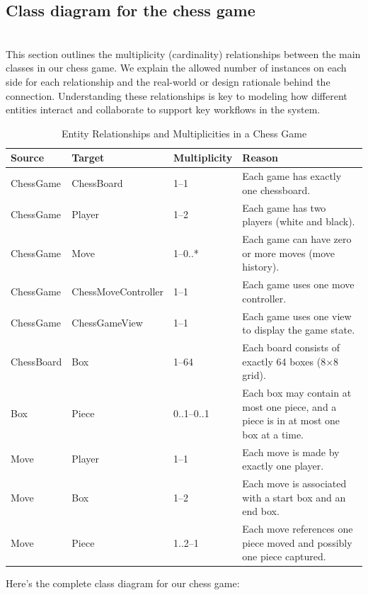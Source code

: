\subsection{Class diagram for the chess game}\label{_J1DMnFsFt0FoyHnpKEiO}
\\
This section outlines the multiplicity (cardinality) relationships between the main classes in our chess game. We explain the allowed number of instances on each side for each relationship and the real-world or design rationale behind the connection. Understanding these relationships is key to modeling how different entities interact and collaborate to support key workflows in the system.

\begin{table}[h!]
\centering
\begin{tabular}{|p{3.5cm}|p{3.5cm}|p{3cm}|p{6.5cm}|}
\hline
\textbf{Source} & \textbf{Target} & \textbf{Multiplicity} & \textbf{Reason} \\
\hline
ChessGame & ChessBoard & 1--1 & Each game has exactly one chessboard. \\
\hline
ChessGame & Player & 1--2 & Each game has two players (white and black). \\
\hline
ChessGame & Move & 1--0..* & Each game can have zero or more moves (move history). \\
\hline
ChessGame & ChessMoveController & 1--1 & Each game uses one move controller. \\
\hline
ChessGame & ChessGameView & 1--1 & Each game uses one view to display the game state. \\
\hline
ChessBoard & Box & 1--64 & Each board consists of exactly 64 boxes (8$\times$8 grid). \\
\hline
Box & Piece & 0..1--0..1 & Each box may contain at most one piece, and a piece is in at most one box at a time. \\
\hline
Move & Player & 1--1 & Each move is made by exactly one player. \\
\hline
Move & Box & 1--2 & Each move is associated with a start box and an end box. \\
\hline
Move & Piece & 1..2--1 & Each move references one piece moved and possibly one piece captured. \\
\hline
\end{tabular}
\caption{Entity Relationships and Multiplicities in a Chess Game}
\label{tab:chess_entity_relationships}
\end{table}


Here's the complete class diagram for our chess game:

